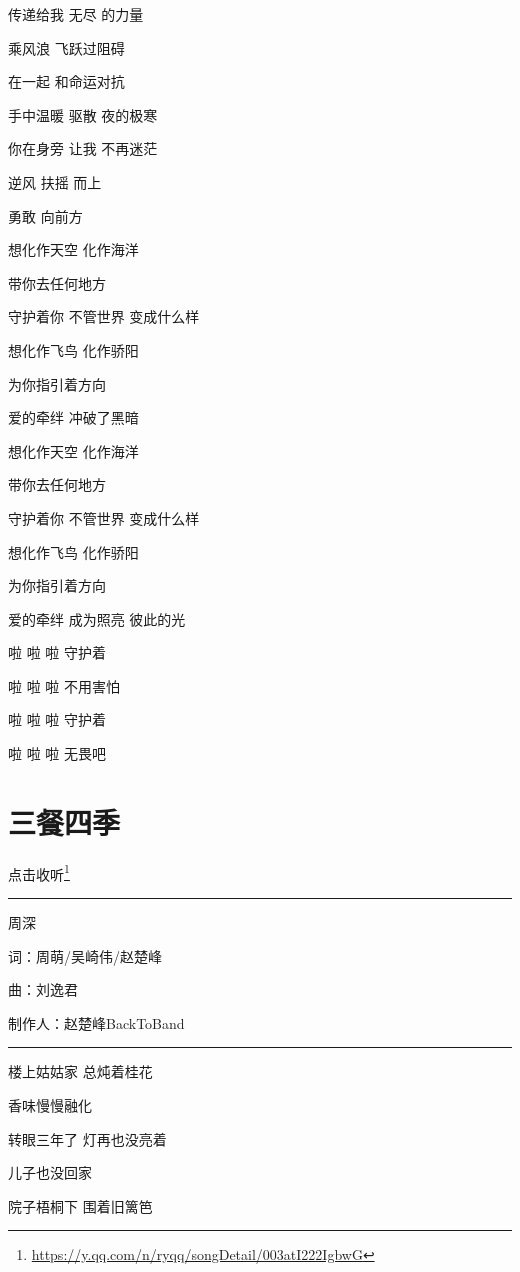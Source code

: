 \documentclass[]{ctexbook}
\renewcommand{\href}[2]{#2\footnote{\url{#1}}}
\begin{document}
传递给我 无尽 的力量

乘风浪 飞跃过阻碍

在一起 和命运对抗

手中温暖 驱散 夜的极寒

你在身旁 让我 不再迷茫

逆风 扶摇 而上

勇敢 向前方

想化作天空 化作海洋

带你去任何地方

守护着你 不管世界 变成什么样

想化作飞鸟 化作骄阳

为你指引着方向

爱的牵绊 冲破了黑暗

想化作天空 化作海洋

带你去任何地方

守护着你 不管世界 变成什么样

想化作飞鸟 化作骄阳

为你指引着方向

爱的牵绊 成为照亮 彼此的光

啦 啦 啦 守护着

啦 啦 啦 不用害怕

啦 啦 啦 守护着

啦 啦 啦 无畏吧

\section*{三餐四季}\label{three-meals-a-day}


\href{https://y.qq.com/n/ryqq/songDetail/003atI222IgbwG}{点击收听}

\begin{center}\rule{0.5\linewidth}{0.5pt}\end{center}

周深

词：周萌/吴崎伟/赵楚峰

曲：刘逸君

制作人：赵楚峰BackToBand

\begin{center}\rule{0.5\linewidth}{0.5pt}\end{center}

楼上姑姑家 总炖着桂花

香味慢慢融化

转眼三年了 灯再也没亮着

儿子也没回家

院子梧桐下 围着旧篱笆
\end{document}
